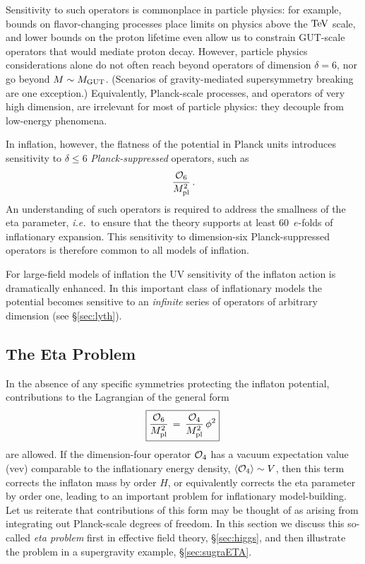 \documentclass[12pt,letterpaper,rotate]{article}
\def\beq{\begin{equation}}
\def\eeq{\end{equation}}
\begin{document}
{Sensitivity to such operators is commonplace in particle physics: for example, bounds on flavor-changing processes place limits on physics above the ${\rm TeV}$ scale,
and lower bounds on the proton lifetime even allow us to constrain GUT-scale operators that would mediate proton decay.
However, particle physics considerations alone do not often reach beyond operators of dimension $\delta=6$, nor go beyond $M\sim M_{\rm GUT}$.  (Scenarios of gravity-mediated supersymmetry breaking are one exception.)  Equivalently, Planck-scale processes, and operators of very high dimension, are irrelevant for most of particle physics: they decouple from low-energy phenomena.

In inflation, however, the flatness of the potential in Planck units introduces sensitivity
to  $\delta\le 6$ {\it Planck-suppressed} operators, such as
\begin{equation}
\label{equ:O6}
\frac{{\cal{O}}_{6}}{M_{\rm pl}^{2}}\, .
\end{equation}
An understanding of such operators is required to address the smallness of the eta parameter, {\it i.e.}~to ensure that the theory supports at least 60~$e$-folds of inflationary expansion.  This sensitivity to dimension-six Planck-suppressed operators is therefore common to all models of inflation.

For large-field models of inflation the UV sensitivity of the inflaton action is dramatically enhanced.
In this important class of inflationary models the potential becomes sensitive to an {\it infinite} series of operators  of arbitrary dimension (see \S\ref{sec:lyth}).


\subsection{The Eta Problem}

In the absence of any specific symmetries protecting the inflaton potential,
contributions to the Lagrangian of the general form
\beq
\fbox{$\displaystyle
\frac{{\cal O}_6}{M_{\rm pl}^2}\, = \, \frac{{\cal O}_4}{M_{\rm pl}^2}\, \phi^2$}\,
\eeq
are allowed.
If the dimension-four operator ${\cal O}_4$ has a vacuum expectation value
(vev) comparable to the inflationary energy density, $\langle{\cal O}_4 \rangle \sim V$, then this term corrects the inflaton mass by order $H$, or equivalently corrects the eta parameter by order one, leading
to an important problem for inflationary model-building.
Let us reiterate that contributions of this form may be thought of as arising from integrating out Planck-scale degrees of freedom.
In this section we discuss this so-called {\it eta problem} first in effective field theory, \S\ref{sec:higgs}, and then illustrate the problem in a supergravity example, \S\ref{sec:sugraETA}.

}
\end{document}
